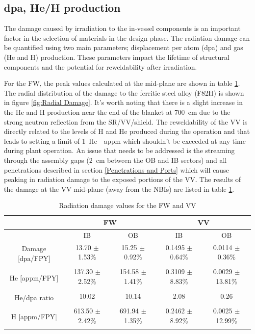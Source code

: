 \documentclass[12pt, letterpaper]{elsarticle}
\begin{document}
\subsection{dpa, He/H production} \label{dpa, He/H production}
The damage caused by irradiation to the in-vessel components is an important factor in the selection of materials in the design phase. The radiation damage can be quantified using two main parameters; displacement per atom (dpa) and gas (He and H) production. These parameters impact the lifetime of structural components and the potential for reweldability after irradiation.\vspace{5mm}

For the FW, the peak values calculated at the mid-plane are shown in table \ref{Radiation damage values for the FW and VV}. The radial distribution of the damage to the ferritic steel alloy (F82H) is shown in figure \ref{fig:Radial Damage}. It's worth noting that there is a slight increase in the He and H production near the end of the blanket at \SI{700}{cm} due to the strong neutron reflection from the SR/VV/shield. The reweldability of the VV is directly related to the levels of H and He produced during the operation and that leads to setting a limit of \SI{1}{He \hspace{1 mm} appm} which shouldn't be exceeded at any time during plant operation. An issue that needs to be addressed is the streaming through the assembly gaps (\SI{2}{cm} between the OB and IB sectors) and all penetrations described in section \ref{Penetrations and Ports} which will cause peaking in radiation damage to the exposed portions of the VV. The results of the damage at the VV mid-plane (away from the NBIs) are listed in table \ref{Radiation damage values for the FW and VV}.   
\begin{table}[h!]
	\caption{Radiation damage values for the FW and VV}
	\label{Radiation damage values for the FW and VV}
	\begin{tabular}{ |c|c|c|c|c| } 
		\hline
		{} & \multicolumn{2}{|c|}{FW} & \multicolumn{2}{|c|}{VV} \\
		\hline
		{} & IB & OB & IB & OB \\
		\hline
		\multirow{2}{6em}{Damage [dpa/FPY]} & 13.70 $\pm$ 1.53\% & 15.25 $\pm$ 0.92\% & 0.1495 $\pm$ 0.64\% & 0.0114 $\pm$ 0.36\%  \\
		& {} & {} & {} & {} \\
		\hline
		\multirow{2}{6em}{He [appm/FPY]} & 137.30 $\pm$ 2.52\% & 154.58 $\pm$ 1.41\% & 0.3109 $\pm$ 8.83\% & 0.0029 $\pm$ 13.81\%  \\
		& {} & {} & {} & {} \\
		\hline
		\multirow{2}{6em}{He/dpa ratio} & 10.02 & 10.14 & 2.08 & 0.26  \\
		& {} & {} & {} & {} \\
		\hline
		\multirow{2}{6em}{H [appm/FPY]} & 613.50 $\pm$ 2.42\% & 691.94 $\pm$ 1.35\% & 0.2462 $\pm$ 8.92\% & 0.0025 $\pm$ 12.99\%  \\
		& {} & {} & {} & {} \\
		\hline
	\end{tabular}
\end{table}
\end{document}
